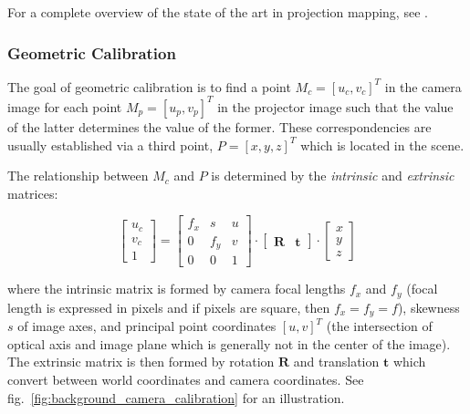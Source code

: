 For a complete overview of the state of the art in projection mapping, see \citet{Grundhofer2018}.

\subsubsection{Geometric Calibration}
\label{section:background-projection_mapping-procams-geometric_calibration}

The goal of geometric calibration is to find a point \(M_c = [u_c, v_c]^T\) in the camera image for each point \(M_p = [u_p, v_p]^T\) in the projector image such that the value of the latter determines the value of the former. These correspondencies are usually established via a third point, \(P = [x, y, z]^T\) which is located in the scene.

The relationship between \(M_c\) and \(P\) is determined by the \textit{intrinsic} and \textit{extrinsic} matrices:

\begin{equation}
    \label{eq:camera_equation}
    \begin{bmatrix}
        u_c \\
        v_c \\
        1
    \end{bmatrix} =
    \begin{bmatrix}
        f_x & s & u \\
        0 & f_y & v \\
        0 & 0 & 1 
    \end{bmatrix} \cdot
    \begin{bmatrix}
        \bm{R} & \bm{t}
    \end{bmatrix} \cdot
    \begin{bmatrix}
        x \\
        y \\
        z
    \end{bmatrix}
\end{equation}

where the intrinsic matrix is formed by camera focal lengths \(f_x\) and \(f_y\) (focal length is expressed in pixels and if pixels are square, then \(f_x = f_y = f\)), skewness \(s\) of image axes, and principal point coordinates \([u, v]^T\) (the intersection of optical axis and image plane which is generally not in the center of the image). The extrinsic matrix is then formed by rotation \(\bm{R}\) and translation \(\bm{t}\) which convert between world coordinates and camera coordinates. See fig.~\ref{fig:background_camera_calibration} for an illustration.

